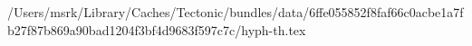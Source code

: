 /Users/msrk/Library/Caches/Tectonic/bundles/data/6ffe055852f8faf66c0acbe1a7fb27f87b869a90bad1204f3bf4d9683f597c7c/hyph-th.tex